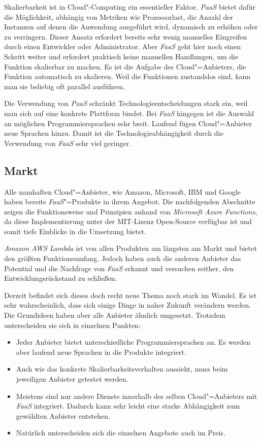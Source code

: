 Skalierbarkeit ist in Cloud"-Computing ein essentieller Faktor. \textit{PaaS} bietet dafür die Möglichkeit, abhängig von Metriken wie Prozessorlast, die Anzahl der Instanzen auf denen die Anwendung ausgeführt wird, dynamisch zu erhöhen oder zu verringern. Dieser Ansatz erfordert bereits sehr wenig manuelles Eingreifen durch einen Entwickler oder Administrator. Aber \textit{FaaS} geht hier noch einen Schritt weiter und erfordert praktisch keine manuellen Handlungen, um die Funktion skalierbar zu machen. Es ist die Aufgabe des Cloud"=Anbieters, die Funktion automatisch zu skalieren. Weil die Funktionen zustandslos sind, kann man sie beliebig oft parallel ausführen.

Die Verwendung von \textit{PaaS} schränkt Technologieentscheidungen stark ein, weil man sich auf eine konkrete Plattform bindet. Bei \textit{FaaS} hingegen ist die Auswahl an möglichen Programmiersprachen sehr breit. Laufend fügen Cloud"=Anbieter neue Sprachen hinzu. Damit ist die Technologieabhängigkeit durch die Verwendung von \textit{FaaS} sehr viel geringer.

\subsection{Markt}

Alle namhaften Cloud"=Anbieter, wie Amazon, Microsoft, IBM und Google haben bereits \textit{FaaS}"=Produkte in ihrem Angebot. Die nachfolgenden Abschnitte zeigen die Funktionsweise und Prinzipien anhand von \textit{Microsoft Azure Functions}, da diese Implementierung unter der MIT-Lizenz Open-Source verfügbar ist und somit tiefe Einblicke in die Umsetzung bietet. 

\textit{Amazon AWS Lambda} ist von allen Produkten am längsten am Markt und bietet den größten Funktionsumfang. Jedoch haben auch die anderen Anbieter das Potential und die Nachfrage von \textit{FaaS} erkannt und versuchen seither, den Entwicklungsrückstand zu schließen.

Derzeit befindet sich dieses doch recht neue Thema noch stark im Wandel. Es ist sehr wahrscheinlich, dass sich einige Dinge in naher Zukunft verändern werden. Die Grundideen haben aber alle Anbieter ähnlich umgesetzt. Trotzdem unterscheiden sie sich in einzelnen Punkten:

\begin{itemize}
	\item Jeder Anbieter bietet unterschiedliche Programmiersprachen an. Es werden aber laufend neue Sprachen in die Produkte integriert.
	\item Auch wie das konkrete Skalierbarkeitsverhalten aussieht, muss beim jeweiligen Anbieter getestet werden.
	\item Meistens sind nur andere Dienste innerhalb des selben Cloud"=Anbieters mit \textit{FaaS} integriert. Dadurch kann sehr leicht eine starke Abhängigkeit zum gewählten Anbieter entstehen.
	\item Natürlich unterscheiden sich die einzelnen Angebote auch im Preis.
\end{itemize}

